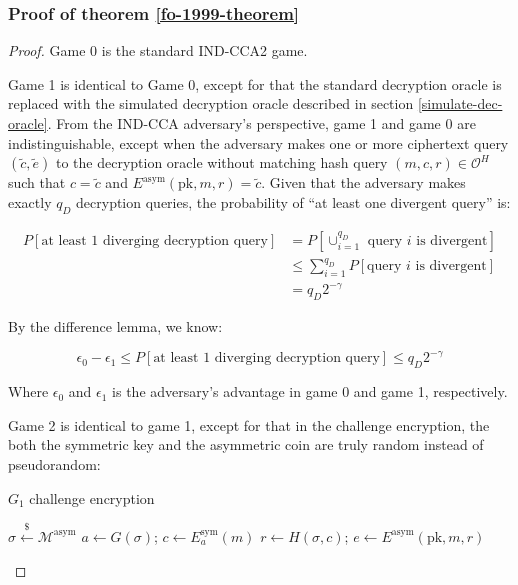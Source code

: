 \documentclass{article}
\newcommand{\leftsample}{\overset{{\scriptscriptstyle\$}}{\leftarrow}}
\begin{document}
\subsubsection{Proof of theorem \ref{fo-1999-theorem}}
\begin{proof}
    Game 0 is the standard IND-CCA2 game.
    
    Game 1 is identical to Game 0, except for that the standard decryption oracle is replaced with the simulated decryption oracle described in section \ref{simulate-dec-oracle}. From the IND-CCA adversary's perspective, game 1 and game 0 are indistinguishable, except when the adversary makes one or more ciphertext query $(\tilde{c}, \tilde{e})$ to the decryption oracle without matching hash query $(m, c, r) \in \mathcal{O}^H$ such that $c = \tilde{c}$ and $E^\text{asym}(\text{pk}, m, r) = \tilde{c}$. Given that the adversary makes exactly $q_D$ decryption queries, the probability of ``at least one divergent query'' is:

    \begin{equation*}
        \begin{aligned}
            P[\text{at least 1 diverging decryption query}]
            &= P[\cup_{i=1}^{q_D} \text{ query $i$ is divergent}] \\
            &\leq \sum_{i=1}^{q_D}P[\text{query $i$ is divergent}] \\
            &= q_D2^{-\gamma}
        \end{aligned}
    \end{equation*}

    By the difference lemma, we know:

    \begin{equation}
        \epsilon_0 - \epsilon_1 
        \leq P[\text{at least 1 diverging decryption query}] 
        \leq q_D2^{-\gamma}
    \end{equation}

    Where $\epsilon_0$ and $\epsilon_1$ is the adversary's advantage in game 0 and game 1, respectively.

    Game 2 is identical to game 1, except for that in the challenge encryption, the both the symmetric key and the asymmetric coin are truly random instead of pseudorandom:

    \begin{multicols}{2}
        \begin{algorithm}[H]
            \SetAlgoLined
            \caption{$G_1$ challenge encryption}
            $\sigma \leftsample \mathcal{M}^\text{asym}$\;
            $a \leftarrow G(\sigma)$; $c \leftarrow E^\text{sym}_a(m)$\;
            $r \leftarrow H(\sigma, c)$;
            $e \leftarrow E^\text{asym}(\text{pk}, m, r)$\;
            \;
        \end{algorithm}
        \columnbreak


\end{multicols}
\end{proof}
\end{document}
